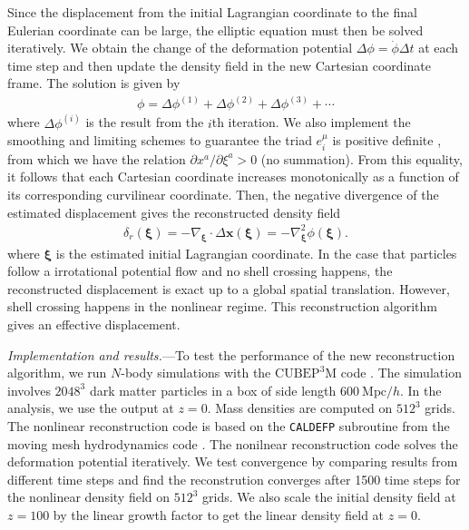 \documentclass[aps,prd,twocolumn,superscriptaddress,groupedaddress,nofootinbib]{revtex4}  %
\newcommand{\mr}{\mathrm}
\newcommand{\bea}{\begin{eqnarray}}
\newcommand{\eea}{\end{eqnarray}}
\begin{document}
Since the displacement from the initial Lagrangian coordinate to the final 
Eulerian coordinate can be large, the elliptic equation must then be solved 
iteratively. We obtain the change of the deformation potential 
$\Delta\phi=\dot{\phi}\Delta t$ at each time step and then update the density
field in the new Cartesian coordinate frame.  
The solution is given by 
\bea
\phi=\Delta\phi^{(1)}+\Delta\phi^{(2)}+\Delta\phi^{(3)}+\cdots
\eea
where $\Delta\phi^{(i)}$ is the result from the $i$th iteration. 
We also implement the smoothing and limiting schemes to guarantee the triad 
$e^\mu_i$ is positive definite \cite{1995ApJS..100..269P,1998ApJS..115...19P},
from which we have the relation $\partial x^a/\partial\xi^a>0$ (no summation).
From this equality, it follows that each Cartesian coordinate increases monotonically as a function of its corresponding curvilinear coordinate.
Then, the negative divergence of the estimated displacement gives the 
reconstructed density field 
\bea
\delta_r(\bm{\xi})=-\nabla_{\bm{\xi}}\cdot\Delta\bm{x}(\bm{\xi})
=-\nabla^2_{\bm{\xi}}\phi(\bm{\xi}).
\eea
where $\bm{\xi}$ is the estimated initial Lagrangian coordinate.
In the case that particles follow a irrotational potential flow and no shell
crossing happens, the reconstructed displacement is exact up to a global 
spatial translation.
However, shell crossing happens in the nonlinear regime. This reconstruction
algorithm gives an effective displacement.


{\it Implementation and results.}---To test the performance of 
the new reconstruction algorithm, we run $N$-body simulations with 
the $\mr{CUBEP}^3\mr{M}$ code \cite{2013code}.
The simulation involves $2048^3$ dark matter particles in a box of 
side length $600\ \mr{Mpc}/h$.
In the analysis, we use the output at $z=0$. Mass densities are computed
on $512^3$ grids. 
The nonlinear reconstruction code is based on the {\tt CALDEFP} subroutine from 
the moving mesh hydrodynamics code \cite{1998ApJS..115...19P}.
The nonilnear reconstruction code solves the deformation potential iteratively.
We test convergence by comparing results from different time steps and 
find the reconstrution converges after 1500 time steps for the nonlinear 
density field on $512^3$ grids. 
We also scale the initial density field at $z=100$ by the linear growth factor
to get the linear density field at $z=0$.
\end{document}
